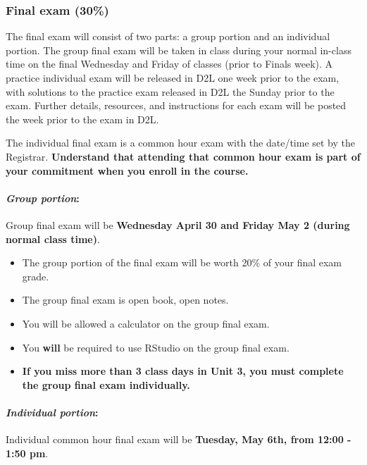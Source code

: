 \documentclass[
]{article}
\providecommand{\tightlist}{%
  \setlength{\itemsep}{0pt}\setlength{\parskip}{0pt}}
\begin{document}
\subsubsection{Final exam (30\%)}\label{final-exam-30}

The final exam will consist of two parts: a group portion and an
individual portion. The group final exam will be taken in class during
your normal in-class time on the final Wednesday and Friday of classes
(prior to Finals week). A practice individual exam will be released in
D2L one week prior to the exam, with solutions to the practice exam
released in D2L the Sunday prior to the exam. Further details,
resources, and instructions for each exam will be posted the week prior
to the exam in D2L.

The individual final exam is a common hour exam with the date/time set
by the Registrar. \textbf{Understand that attending that common hour
exam is part of your commitment when you enroll in the course.}

\paragraph{\texorpdfstring{\emph{Group
portion}:}{Group portion:}}\label{group-portion-1}

Group final exam will be \textbf{Wednesday April 30 and Friday May 2
(during normal class time)}.

\begin{itemize}
\tightlist
\item
  The group portion of the final exam will be worth 20\% of your final
  exam grade.
\item
  The group final exam is open book, open notes.
\item
  You will be allowed a calculator on the group final exam.
\item
  You \textbf{will} be required to use RStudio on the group final exam.
\item
  \textbf{If you miss more than 3 class days in Unit 3, you must
  complete the group final exam individually.}
\end{itemize}

\paragraph{\texorpdfstring{\emph{Individual
portion}:}{Individual portion:}}\label{individual-portion-1}

Individual common hour final exam will be \textbf{Tuesday, May 6th, from
12:00 - 1:50 pm}.
\end{document}
